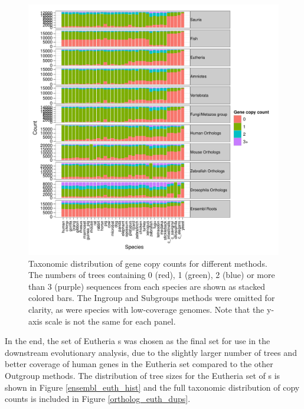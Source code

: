 \begin{figure}[hb]
\centering
\includegraphics[scale=0.7]{Figs/ortholog_stacked_bar.pdf}
\caption{Taxonomic distribution of gene copy counts for different
  \subtr methods. The numbers of trees containing 0 (red), 1 (green),
  2 (blue) or more than 3 (purple) sequences from each species are
  shown as stacked colored bars. The Ingroup and Subgroups methods
  were omitted for clarity, as were species with low-coverage
  genomes. Note that the y-axis scale is not the same for each panel.}
\label{ortholog_stacked_bar}
\end{figure}

In the end, the set of Eutheria \subtr{}s was chosen as the final set
for use in the downstream evolutionary analysis, due to the slightly
larger number of trees and better coverage of human genes in the
Eutheria set compared to the other Outgroup methods. The distribution
of tree sizes for the Eutheria set of \subtr{}s is shown in Figure
\ref{ensembl_euth_hist} and the full taxonomic distribution of copy
counts is included in Figure \ref{ortholog_euth_dups}.

